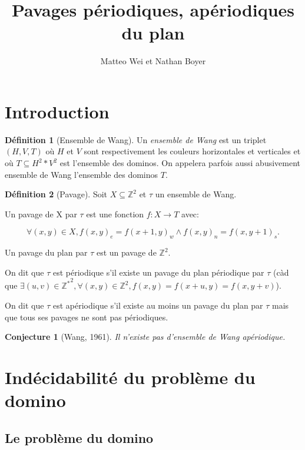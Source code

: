 \documentclass{scrartcl}
\title{Pavages périodiques, apériodiques du plan}
\author{Matteo Wei et Nathan Boyer}
\newcommand{\Z}{\mathbb Z}
\newcommand{\sube}{\subseteq}
\newtheorem{conjecture}{Conjecture}
\theoremstyle{definition}
\newtheorem*{definition}{Définition}
\theoremstyle{remark}
\begin{document}
\maketitle

\section{Introduction}

\begin{definition}[Ensemble de Wang]
    
Un \emph{ensemble de Wang} est un triplet $(H,V,T)$ où $H$ et $V$ sont respectivement les couleurs horizontales et verticales
et où $T \sube H^2 * V^2$ est l'ensemble des dominos. On appelera parfois aussi abusivement ensemble de Wang l'ensemble des dominos $T$.

\end{definition}

\begin{definition}[Pavage]

Soit $X \sube \Z^2$ et $\tau$ un ensemble de Wang.

Un pavage de X par $\tau$ est une fonction $f:X \to T$ avec:

\[\forall (x,y) \in X, {f(x,y)}_e = {f(x+1,y)}_w \land {f(x,y)}_n = {f(x,y+1)}_s.\]

Un pavage du plan par $\tau$ est un pavage de $\Z^2$.

On dit que $\tau$ est périodique s'il existe un pavage du plan périodique par $\tau$
(càd que $\exists (u,v) \in {\Z^*}^2, \forall (x,y) \in \Z^2, f(x,y) = f(x+u,y)=f(x,y+v)$).

On dit que $\tau$ est apériodique s'il existe au moins un pavage du plan par $\tau$ mais que tous ses pavages ne sont pas périodiques.

\begin{conjecture}[Wang, 1961]
  Il n'existe pas d'ensemble de Wang apériodique.
\end{conjecture}
    
\end{definition}



\section{Indécidabilité du problème du domino}

\subsection{Le problème du domino}
\end{document}

